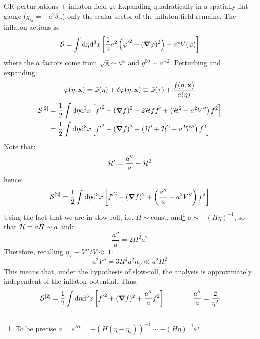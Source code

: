 GR perturbations + inflaton field $ \varphi $. Expanding quadratically in a spatially-flat gauge ($ g_{ij} = -a^2 \delta_{ij} $) only the scalar sector of the inflaton field remains. The inflaton actions is:
\begin{equation*}
  \mathcal{S} = \int \mathrm{d} \eta \mathrm{d}^3x \left[ \frac{1}{2} a^2 \left( {\varphi'}^2 - (\boldsymbol{\nabla} \varphi)^2 \right) - a^4 V(\varphi) \right]
\end{equation*}
where the $ a $ factors come from $ \sqrt{\mathrm{g}} \sim a^4 $ and $ g^{00} \sim a^{-2} $. Perturbing and expanding:
\begin{equation*}
  \varphi(\eta , \mathbf{x}) = \bar{\varphi}(\eta) + \delta \varphi(\eta , \mathbf{x}) \equiv \bar{\varphi}(\tau) + \frac{f(\eta , \mathbf{x})}{a(\eta)}
\end{equation*}
\begin{equation*}
  \begin{split}
    \mathcal{S}^{[2]}
    & = \frac{1}{2} \int \mathrm{d} \eta \mathrm{d}^3x \left[ {f'}^2 - (\boldsymbol{\nabla} f)^2 - 2 \mathcal{H} f f' + \left( \mathcal{H}^2 - a^2 V'' \right)f^2 \right] \\
    & = \frac{1}{2} \int \mathrm{d} \eta \mathrm{d}^3x \left[ {f'}^2 - (\boldsymbol{\nabla} f)^2 + \left( \mathcal{H}' + \mathcal{H}^2 - a^2 V'' \right) f^2 \right]
  \end{split}
\end{equation*}
Note that:
\begin{equation*}
  \mathcal{H}' = \frac{a''}{a} - \mathcal{H}^2
\end{equation*}
hence:
\begin{equation*}
  \mathcal{S}^{[2]} = \frac{1}{2} \int \mathrm{d} \eta \mathrm{d}^3x \left[ {f'}^2 - (\boldsymbol{\nabla} f)^2 + \left( \frac{a''}{a} - a^2 V'' \right) f^2 \right]
\end{equation*}
Using the fact that we are in slow-roll, i.e. $ H \sim \text{const.} $ and\footnote{To be precise $ a = e^{H t} = - (H (\eta - \eta_\text{e}))^{-1} \sim - (H \eta)^{-1} $} $ a \sim - (H \eta)^{-1} $, so that $ \mathcal{H} = a H \sim a $ and:
\begin{equation*}
  \frac{a''}{a} = 2 H^2 a^2
\end{equation*}
Therefore, recalling $ \eta_V \equiv V'' / V \ll 1 $:
\begin{equation*}
  a^2 V'' = 3 H^2 a^2 \eta_V \ll a^2 H^2
\end{equation*}
This means that, under the hypothesis of slow-roll, the analysis is approximately independent of the inflaton potential. Thus:
\begin{equation*}
  \mathcal{S}^{[2]} = \frac{1}{2} \int \mathrm{d} \eta \mathrm{d}^3x \left[ {f'}^2 + (\boldsymbol{\nabla} f)^2 + \frac{a''}{a} f^2 \right]
  \qquad \qquad
  \frac{a''}{a} = \frac{2}{\eta^2}
\end{equation*}
